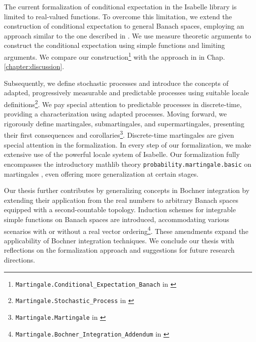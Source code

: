 The current formalization of conditional expectation in the Isabelle library is limited to real-valued functions. To overcome this limitation, we extend the construction of conditional expectation to general Banach spaces, employing an approach similar to the one described in \cite{Hytoenen_2016}. We use measure theoretic arguments to construct the conditional expectation using simple functions and limiting arguments. We compare our construction\footnote{\texttt{Martingale.Conditional\_Expectation\_Banach} in \cite{Keskin_A_Formalization_of_2023}} with the approach in \cite{Hytoenen_2016} in Chap. \ref{chapter:discussion}.

Subsequently, we define stochastic processes and introduce the concepts of adapted, progressively measurable and predictable processes using suitable locale definitions\footnote{\texttt{Martingale.Stochastic\_Process} in \cite{Keskin_A_Formalization_of_2023}}. We pay special attention to predictable processes in discrete-time, providing a characterization using adapted processes. Moving forward, we rigorously define martingales, submartingales, and supermartingales, presenting their first consequences and corollaries\footnote{\texttt{Martingale.Martingale} in \cite{Keskin_A_Formalization_of_2023}}. Discrete-time martingales are given special attention in the formalization. In every step of our formalization, we make extensive use of the powerful locale system of Isabelle.
Our formalization fully encompasses the introductory \textsf{mathlib} theory \texttt{probability.mar\-tingale.basic} on martingales \cite{Degenne_Ying_2022}, even offering more generalization at certain stages.

Our thesis further contributes by generalizing concepts in Bochner integration by extending their application from the real numbers to arbitrary Banach spaces equipped with a second-countable topology. Induction schemes for integrable simple functions on Banach spaces are introduced, accommodating various scenarios with or without a real vector ordering\footnote{\texttt{Martingale.Bochner\_Integration\_Addendum} in \cite{Keskin_A_Formalization_of_2023}}. These amendments expand the applicability of Bochner integration techniques.
We conclude our thesis with reflections on the formalization approach and suggestions for future research directions.